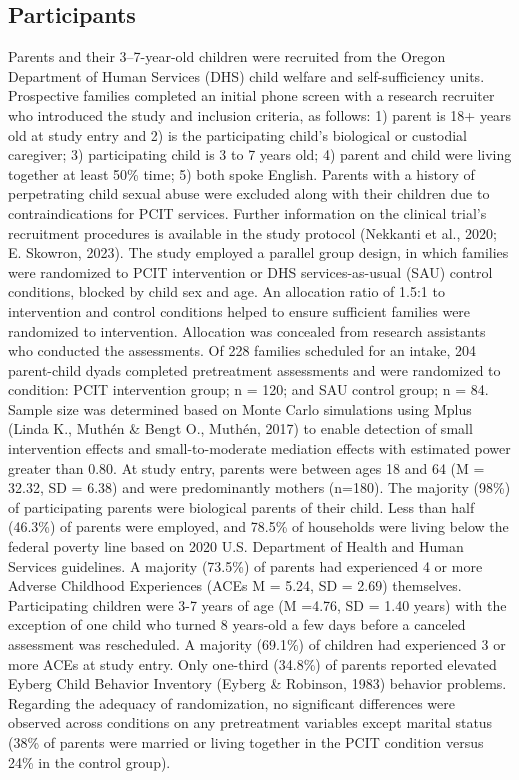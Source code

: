 \documentclass[12pt]{./styles/outhesis}
\begin{document}
\subsection{Participants}
Parents and their 3--7-year-old children were recruited from the Oregon
Department of Human Services (DHS) child welfare and self-sufficiency
units. Prospective families completed an initial phone screen with a
research recruiter who introduced the study and inclusion criteria, as
follows: 1) parent is 18+ years old at study entry and 2) is the
participating child's biological or custodial caregiver; 3)
participating child is 3 to 7 years old; 4) parent and child were living
together at least 50\% time; 5) both spoke English. Parents with a
history of perpetrating child sexual abuse were excluded along with
their children due to contraindications for PCIT services. Further
information on the clinical trial's recruitment procedures is available
in the study protocol (Nekkanti et al., 2020; E. Skowron, 2023). The
study employed a parallel group design, in which families were
randomized to PCIT intervention or DHS services-as-usual (SAU) control
conditions, blocked by child sex and age. An allocation ratio of 1.5:1
to intervention and control conditions helped to ensure sufficient
families were randomized to intervention. Allocation was concealed from
research assistants who conducted the assessments. Of 228 families
scheduled for an intake, 204 parent-child dyads completed pretreatment
assessments and were randomized to condition: PCIT intervention group; n
= 120; and SAU control group; n = 84. Sample size was determined based
on Monte Carlo simulations using Mplus (Linda K., Muthén \& Bengt O.,
Muthén, 2017) to enable detection of small intervention effects and
small-to-moderate mediation effects with estimated power greater than
0.80. At study entry, parents were between ages 18 and 64 (M = 32.32, SD
= 6.38) and were predominantly mothers (n=180). The majority (98\%) of
participating parents were biological parents of their child. Less than
half (46.3\%) of parents were employed, and 78.5\% of households were
living below the federal poverty line based on 2020 U.S. Department of
Health and Human Services guidelines. A majority (73.5\%) of parents had
experienced 4 or more Adverse Childhood Experiences (ACEs M = 5.24, SD =
2.69) themselves. Participating children were 3-7 years of age (M =4.76,
SD = 1.40 years) with the exception of one child who turned 8 years-old
a few days before a canceled assessment was rescheduled. A majority
(69.1\%) of children had experienced 3 or more ACEs at study entry. Only
one-third (34.8\%) of parents reported elevated Eyberg Child Behavior
Inventory (Eyberg \& Robinson, 1983) behavior problems. Regarding the
adequacy of randomization, no significant differences were observed
across conditions on any pretreatment variables except marital status
(38\% of parents were married or living together in the PCIT condition
versus 24\% in the control group).
\end{document}
